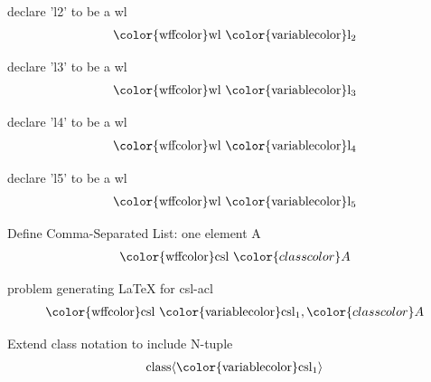 \begin{lemma} declare 'l2' to be a wl
\begin{align}
{\rm\color{wffcolor} wl}~ {\rm\color{variablecolor}l_2}\label{wl2}
\end{align}
\end{lemma}

\begin{lemma} declare 'l3' to be a wl
\begin{align}
{\rm\color{wffcolor} wl}~ {\rm\color{variablecolor}l_3}\label{wl3}
\end{align}
\end{lemma}

\begin{lemma} declare 'l4' to be a wl
\begin{align}
{\rm\color{wffcolor} wl}~ {\rm\color{variablecolor}l_4}\label{wl4}
\end{align}
\end{lemma}

\begin{lemma} declare 'l5' to be a wl
\begin{align}
{\rm\color{wffcolor} wl}~ {\rm\color{variablecolor}l_5}\label{wl5}
\end{align}
\end{lemma}

\begin{lemma} Define Comma-Separated List: one element A
\begin{align}
{\rm\color{wffcolor} csl}~ {\color{classcolor}A}\label{csl-a}
\end{align}
\end{lemma}

\begin{lemma} problem generating LaTeX for csl-acl
\begin{align}
{\rm\color{wffcolor} csl}~ {\rm\color{variablecolor}csl_1} ,
    {\color{classcolor}A}\label{csl-acl}
\end{align}
\end{lemma}

\begin{lemma} Extend class notation to include  N-tuple
\begin{align}
{\rm class} \langle {\rm\color{variablecolor}csl_1} \rangle\label{cl-ntupl}
\end{align}
\end{lemma}

